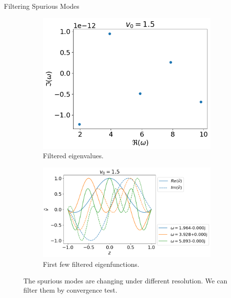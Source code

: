 \begin{frame}{Filtering Spurious Modes}
  \begin{figure}[htbp]
    \centering
    \begin{subfigure}[b]{0.4\linewidth}
      \includegraphics[width=\linewidth]{figures/eigvals-good} 
      \caption{Filtered eigenvalues.}
    \end{subfigure}%
    \begin{subfigure}[b]{0.6\linewidth}
      \includegraphics[width=\linewidth]{figures/eigvecs-good} 
      \caption{First few filtered eigenfunctions.}
    \end{subfigure}
    \caption{The spurious modes are changing under different resolution. We can filter them by convergence test.}
    \label{fig:results-good}
  \end{figure}
\end{frame}
